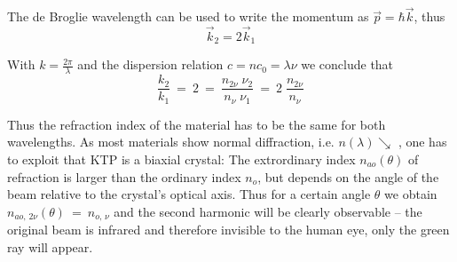 The de Broglie wavelength can be used to write the momentum as  $\vec p = \hbar \vec k$, thus
\begin{equation}
	\vec k_2 = 2 \vec k_1
\end{equation}

With $k = \frac{2 \pi}{\lambda}$ and the dispersion relation $c = n c_0 = \lambda \nu$ we conclude that
\begin{equation}
\frac{k_2}{k_1} ~=~ 2 ~=~ \frac{n_{2\nu} \; \nu_2}{n_\nu \; \nu_1} ~=~ 2\;\frac{n_{2\nu}}{n_\nu}
\end{equation}

Thus the refraction index of the material has to be the same for both wavelengths. As most materials show normal diffraction, i.e. $n(\lambda) \searrow$ , one has to exploit that KTP is a biaxial crystal: The extrordinary index $n_{ao}(\theta)$ of refraction is larger than the ordinary index $n_o$, but depends on the angle of the beam relative to the crystal's optical axis. Thus for a certain angle $\theta$ we obtain $n_{ao, \,2\nu}(\theta) ~=~ n_{o, \,\nu}$ and the second harmonic will be clearly observable -- the original beam is infrared and therefore invisible to the human eye, only the green ray will appear.

